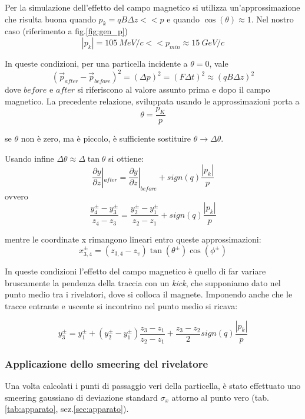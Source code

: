 \documentclass[8pt]{extarticle}
\begin{document}
Per la simulazione dell'effetto del campo magnetico si utilizza un'approssimazione che risulta buona quando $p_k = qB\Delta z << p$ e quando $\cos(\theta) \approx 1$. Nel nostro caso (riferimento a fig.\ref{fig:gen_p})
$$
|p_k| = 105\ MeV/c << p_{min} \approx 15\ GeV/c
$$

In queste condizioni, per una particella incidente a $\theta = 0$, vale
$$
(\vec{p}_{after}-\vec{p}_{before})^2 = (\Delta p)^2 = (F \Delta t)^2 \approx (qB\Delta z)^2
$$
dove $before$ e $after$ si riferiscono al valore assunto prima e dopo il campo magnetico. La precedente relazione, sviluppata usando le approssimazioni porta a
$$
\theta = \frac{p_K}{p}
$$

se $\theta$ non è zero, ma è piccolo, è sufficiente sostituire $\theta \rightarrow \Delta \theta$. 

Usando infine $\Delta \theta \approx \Delta \tan{\theta}$ si ottiene:
$$
\frac{\partial y}{\partial z}|_{after} = \frac{\partial y}{\partial z}|_{before} + sign(q)\frac{|p_k|}{p}
$$
ovvero
\begin{equation}
\frac{y_4^{\pm}-y_3^{\pm}}{z_4-z_3} = \frac{y_2^{\pm}-y_1^{\pm}}{z_2-z_1} + sign(q)\frac{|p_k|}{p}
\label{eq:curvatura}
\end{equation}


mentre le coordinate x rimangono lineari entro queste approssimazioni: 
\begin{equation}
x_{3,4}^{\pm} = (z_{3,4} - z_v) \tan(\theta^{\pm})\cos(\phi^{\pm})
\end{equation}

In queste condizioni l'effetto del campo magnetico è quello di far variare bruscamente la pendenza della traccia con un \textit{kick}, che supponiamo dato nel punto medio tra i rivelatori, dove si colloca il magnete. Imponendo anche che le tracce entrante e uscente si incontrino nel punto medio si ricava:

\begin{equation}
y_3^{\pm} = y_1^{\pm} + (y_2^{\pm}-y_1^{\pm})\frac{z_3-z_1}{z_2-z_1} + \frac{z_3-z_2}{2} sign(q) \frac{|p_k|}{p}
\end{equation}

\subsubsection{Applicazione dello smeering del rivelatore}
Una volta calcolati i punti di passaggio veri della particella, è stato effettuato uno smeering gaussiano di deviazione standard $\sigma_x$ attorno al punto vero (tab.\ref{tab:apparato}, sez.\ref{sec:apparato}).
\end{document}
